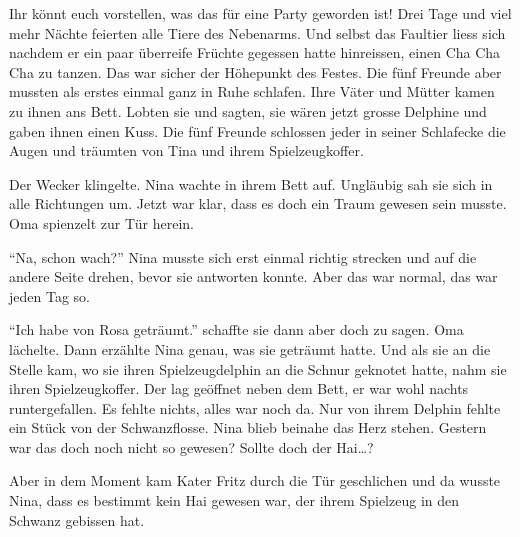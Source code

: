 Ihr könnt euch vorstellen, was das für eine Party geworden ist! Drei Tage und viel mehr Nächte feierten alle Tiere des Nebenarms. Und selbst das Faultier liess sich nachdem er ein paar überreife Früchte gegessen hatte hinreissen, einen Cha Cha Cha zu tanzen. Das war sicher der Höhepunkt des Festes. Die fünf Freunde aber mussten als erstes einmal ganz in Ruhe schlafen. Ihre Väter und Mütter kamen zu ihnen ans Bett. Lobten sie und sagten, sie wären jetzt grosse Delphine und gaben ihnen einen Kuss. Die fünf Freunde schlossen jeder in seiner Schlafecke die Augen und träumten von Tina und ihrem Spielzeugkoffer.

\medskip
\begin{mdframed}[style=mystyle]
Der Wecker klingelte. Nina wachte in ihrem Bett auf. Ungläubig sah sie sich in alle Richtungen um. Jetzt war klar, dass es doch ein Traum gewesen sein musste. Oma spienzelt zur Tür herein.

\enquote{Na, schon wach?} Nina musste sich erst einmal richtig strecken und auf die andere Seite drehen, bevor sie antworten konnte. Aber das war normal, das war jeden Tag so.

\enquote{Ich habe von Rosa geträumt.} schaffte sie dann aber doch zu sagen. Oma lächelte. Dann erzählte Nina genau, was sie geträumt hatte. Und als sie an die Stelle kam, wo sie ihren Spielzeugdelphin an die Schnur geknotet hatte, nahm sie ihren Spielzeugkoffer. Der lag geöffnet neben dem Bett, er war wohl nachts runtergefallen. Es fehlte nichts, alles war noch da. Nur von ihrem Delphin fehlte ein Stück von der Schwanzflosse. Nina blieb beinahe das Herz stehen. Gestern war das doch noch nicht so gewesen? Sollte doch der Hai\dots?

Aber in dem Moment kam Kater Fritz durch die Tür geschlichen und da wusste Nina, dass es bestimmt kein Hai gewesen war, der ihrem Spielzeug in den Schwanz gebissen hat. 
\end{mdframed}\medskip
